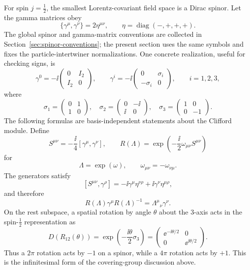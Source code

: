 For spin \(j=\frac12\), the smallest Lorentz-covariant field space is a Dirac
spinor. Let the gamma matrices obey
\[
  \{\gamma^\mu,\gamma^\nu\}=2\eta^{\mu\nu},
  \qquad
  \eta=\operatorname{diag}(-,+,+,+).
\]
The global spinor and gamma-matrix conventions are collected in
Section~\ref{sec:spinor-conventions}; the present section uses the same
symbols and fixes the particle-intertwiner normalizations.
One concrete realization, useful for checking signs, is
\[
  \gamma^0
  =
  -\ii
  \begin{pmatrix}
    0&I_2\\ I_2&0
  \end{pmatrix},
  \qquad
  \gamma^i
  =
  -\ii
  \begin{pmatrix}
    0&\sigma_i\\ -\sigma_i&0
  \end{pmatrix},
  \qquad i=1,2,3,
\]
where
\[
  \sigma_1=\begin{pmatrix}0&1\\1&0\end{pmatrix},
  \quad
  \sigma_2=\begin{pmatrix}0&-\ii\\ \ii&0\end{pmatrix},
  \quad
  \sigma_3=\begin{pmatrix}1&0\\0&-1\end{pmatrix}.
\]
The following formulas are basis-independent statements about the Clifford
module.
Define
\[
  S^{\mu\nu}
  =
  -\frac{\ii}{4}[\gamma^\mu,\gamma^\nu],
  \qquad
  R(\Lambda)
  =
  \exp\!\left(-\frac{\ii}{2}\omega_{\mu\nu}S^{\mu\nu}\right)
\]
for
\[
  \Lambda=\exp(\omega),
  \qquad
  \omega_{\mu\nu}=-\omega_{\nu\mu}.
\]
The generators satisfy
\[
  [S^{\mu\nu},\gamma^\rho]
  =
  -\ii\gamma^\mu\eta^{\nu\rho}
  +\ii\gamma^\nu\eta^{\mu\rho},
\]
and therefore
\[
  R(\Lambda)\gamma^\mu R(\Lambda)^{-1}
  =
  \Lambda^\mu{}_\nu\gamma^\nu .
\]
On the rest subspace, a spatial rotation by angle \(\theta\) about the
\(3\)-axis acts in the spin-\(\frac12\) representation as
\[
  D\!\left(R_{12}(\theta)\right)
  =
  \exp\!\left(-\frac{\ii\theta}{2}\sigma_3\right)
  =
  \begin{pmatrix}
    \ee^{-\ii\theta/2}&0\\
    0&\ee^{\ii\theta/2}
  \end{pmatrix}.
\]
Thus a \(2\pi\) rotation acts by \(-1\) on a spinor, while a \(4\pi\)
rotation acts by \(+1\). This is the infinitesimal form of the covering-group
discussion above.

